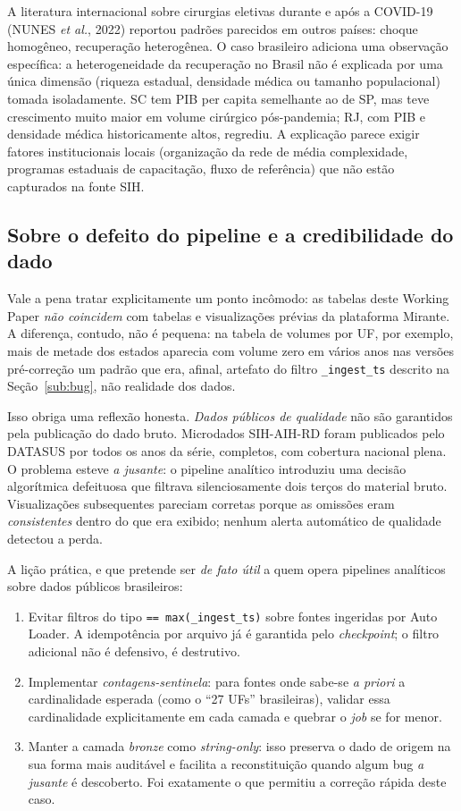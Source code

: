 \documentclass[12pt,a4paper,oneside]{article}
\begin{document}
A literatura internacional sobre cirurgias eletivas durante e
após a COVID-19 (NUNES \textit{et al.}, 2022) reportou padrões
parecidos em outros países: choque homogêneo, recuperação
heterogênea. O caso brasileiro adiciona uma observação
específica: a heterogeneidade da recuperação no Brasil não é
explicada por uma única dimensão (riqueza estadual, densidade
médica ou tamanho populacional) tomada isoladamente. SC tem PIB
per capita semelhante ao de SP, mas teve crescimento muito
maior em volume cirúrgico pós-pandemia; RJ, com PIB e densidade
médica historicamente altos, regrediu. A explicação parece exigir
fatores institucionais locais (organização da rede de média
complexidade, programas estaduais de capacitação, fluxo de
referência) que não estão capturados na fonte SIH.

\subsection{Sobre o defeito do pipeline e a credibilidade do dado}

Vale a pena tratar explicitamente um ponto incômodo: as tabelas
deste Working Paper \textit{não coincidem} com tabelas e
visualizações prévias da plataforma Mirante. A diferença, contudo,
não é pequena: na tabela de volumes por UF, por exemplo, mais de
metade dos estados aparecia com volume zero em vários anos nas
versões pré-correção \textemdash{} um padrão que era, afinal,
artefato do filtro \texttt{\_ingest\_ts} descrito na
Seção~\ref{sub:bug}, não realidade dos dados.

Isso obriga uma reflexão honesta. \textit{Dados públicos de
qualidade} não são garantidos pela publicação do dado bruto.
Microdados SIH-AIH-RD foram publicados pelo DATASUS por todos
os anos da série, completos, com cobertura nacional plena. O
problema esteve \textit{a jusante}: o pipeline analítico
introduziu uma decisão algorítmica defeituosa que filtrava
silenciosamente dois terços do material bruto. Visualizações
subsequentes pareciam corretas porque as omissões eram
\textit{consistentes} dentro do que era exibido; nenhum alerta
automático de qualidade detectou a perda.

A lição prática, e que pretende ser \textit{de fato útil} a
quem opera pipelines analíticos sobre dados públicos brasileiros:

\begin{enumerate}
\item Evitar filtros do tipo \texttt{== max(\_ingest\_ts)} sobre
fontes ingeridas por Auto Loader. A idempotência por arquivo já
é garantida pelo \textit{checkpoint}; o filtro adicional não é
defensivo, é destrutivo.
\item Implementar \textit{contagens-sentinela}: para fontes onde
sabe-se \textit{a priori} a cardinalidade esperada (como o
``27 UFs'' brasileiras), validar essa cardinalidade explicitamente
em cada camada e quebrar o \textit{job} se for menor.
\item Manter a camada \textit{bronze} como \textit{string-only}:
isso preserva o dado de origem na sua forma mais auditável e
facilita a reconstituição quando algum bug \textit{a jusante} é
descoberto. Foi exatamente o que permitiu a correção rápida deste
caso.
\end{enumerate}
\end{document}
